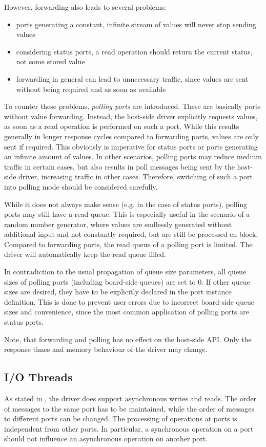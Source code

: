 \documentclass{report}
\begin{document}
However, forwarding also leads to several problems:
\begin{itemize} \itemsep1pt \parskip0pt 
\item ports generating a constant, infinite stream of values will never stop sending values
\item considering status ports, a read operation should return the current status, not some stored value
\item forwarding in general can lead to unnecessary traffic, since values are sent without being required and as soon as available
\end{itemize}

To counter these problems, \textit{polling ports} are introduced. These are basically ports without value forwarding. Instead, the host-side driver explicitly requests values, as soon as a read operation is performed on such a port. While this results generally in longer response cycles compared to forwarding ports, values are only sent if required. This obviously is imperative for status ports or ports generating an infinite amount of values. In other scenarios, polling ports may reduce medium traffic in certain cases, but also results in poll messages being sent by the host-side driver, increasing traffic in other cases. Therefore, switching of such a port into polling mode should be considered carefully.

While it does not always make sense (e.g. in the case of status ports), polling ports may still have a read queue. This is especially useful in the scenario of a random number generator, where values are endlessly generated without additional input and not constantly required, but are still be processed en block. Compared to forwarding ports, the read queue of a polling port is limited. The driver will automatically keep the read queue filled. 

In contradiction to the usual propagation of queue size parameters, all queue sizes of polling ports (including board-side queues) are set to 0. If other queue sizes are desired, they have to be explicitly declared in the port instance definition. This is done to prevent user errors due to incorrect board-side queue sizes and convenience, since the most common application of polling ports are status ports.

Note, that forwarding and polling has no effect on the host-side API. Only the response times and memory behaviour of the driver may change.

\subsection{I/O Threads}
\label{sec:arch:threads}
As stated in , the driver does support asynchronous writes and reads. The order of messages to the same port has to be maintained, while the order of messages to different ports can be changed. The processing of operations at ports is independent from other ports. In particular, a synchronous operation on a port should not influence an asynchronous operation on another port.
\end{document}
